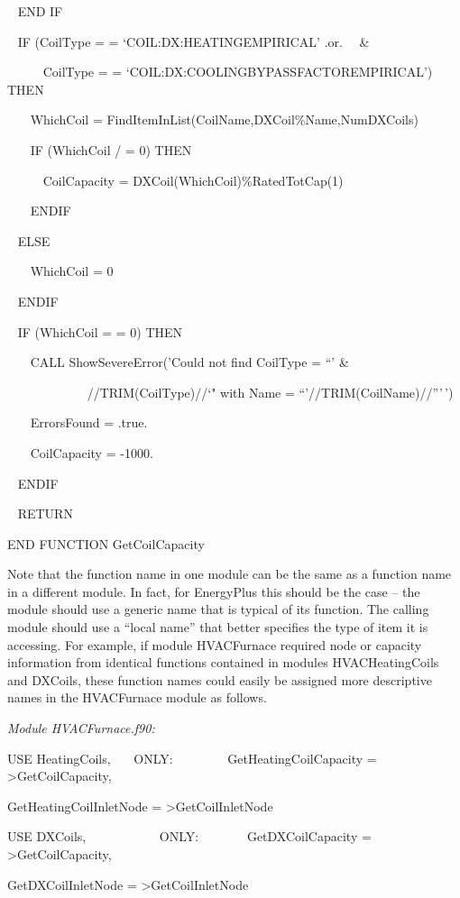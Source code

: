 ~ END IF

~ IF (CoilType = = `COIL:DX:HEATINGEMPIRICAL' .or.~~ \&

~~~~~ CoilType = = `COIL:DX:COOLINGBYPASSFACTOREMPIRICAL') THEN

~~~ WhichCoil = FindItemInList(CoilName,DXCoil\%Name,NumDXCoils)

~~~ IF (WhichCoil / = 0) THEN

~~~~~ CoilCapacity = DXCoil(WhichCoil)\%RatedTotCap(1)

~~~ ENDIF

~ ELSE

~~~ WhichCoil = 0

~ ENDIF

~ IF (WhichCoil = = 0) THEN

~~~ CALL ShowSevereError('Could not find CoilType = ``' \&

~~~~~~~~~~~~ //TRIM(CoilType)//`" with Name = ``'//TRIM(CoilName)//'''\,')

~~~ ErrorsFound = .true.

~~~ CoilCapacity = -1000.

~ ENDIF

~ RETURN

END FUNCTION GetCoilCapacity

Note that the function name in one module can be the same as a function name in a different module. In fact, for EnergyPlus this should be the case -- the module should use a generic name that is typical of its function. The calling module should use a ``local name'' that better specifies the type of item it is accessing. For example, if module HVACFurnace required node or capacity information from identical functions contained in modules HVACHeatingCoils and DXCoils, these function names could easily be assigned more descriptive names in the HVACFurnace module as follows.

\emph{Module HVACFurnace.f90:}

USE HeatingCoils,~~~ ONLY:~~~~~~~~ GetHeatingCoilCapacity = \textgreater{}GetCoilCapacity,

GetHeatingCoilInletNode = \textgreater{}GetCoilInletNode

USE DXCoils,~~~~~~~ ~~~~ONLY:~~~~~~~ GetDXCoilCapacity = \textgreater{}GetCoilCapacity,

GetDXCoilInletNode = \textgreater{}GetCoilInletNode
